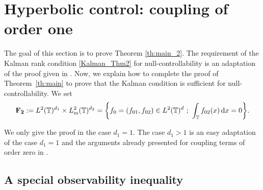 \documentclass[10pt]{amsart}
\theoremstyle{plain}
\theoremstyle{definition}
\theoremstyle{remark}
\newcommand{\diff}[1][-3]{\ensuremath{\mathop{}\mkern#1mu\mathrm{d}}}
\newcommand{\set}{\mathbb}
\newcommand{\T}{\set{T}}
\newcommand{\coloneqq}{\mathrel{\mathord{:}\mathord=}}
\newcommand{\m}{{\mathrm m}}
\let\originalleft\left
\let\originalright\right
\renewcommand{\left}{\mathopen{}\mathclose\bgroup\originalleft}
\renewcommand{\right}{\aftergroup\egroup\originalright}
\begin{document}
\section{Hyperbolic control: coupling of order one} \label{Sec:Hyp}

The goal of this section is to prove Theorem \ref{th:main_2}.
The requirement of the Kalman rank condition \eqref{Kalman_Thm2} for null-controllability is an adaptation of the proof given in . Now, we explain how to complete the proof of Theorem~\ref{th:main} to prove that the Kalman condition is sufficient for null-controllability. We set
\begin{equation}
\label{defInvQuant}
\mathbf{F_2} \coloneqq L^2(\T)^{d_1} \times L^2_\m(\T)^{d_2} = \left\{ f_0=(f_{01},f_{02}) \in L^2(\T)^d\ ;\ \int_{\T} f_{02}(x) \diff x = 0\right\}.
\end{equation}

We only give the proof in the case $d_1=1$. The case $d_1 >1$ is an easy adaptation of the case $d_1=1$ and the arguments already presented for coupling terms of order zero in .

\subsection{A special observability inequality}
\end{document}
